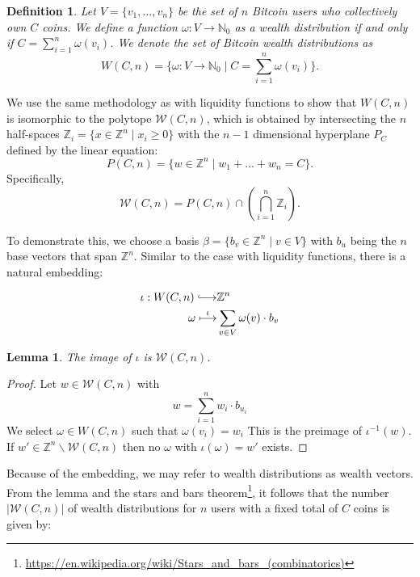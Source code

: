 \documentclass[10pt,twocolumn]{article}
\newtheorem{definition}{Definition}[section]
\newtheorem{lemma}[theorem]{Lemma}
\newcommand{\longhookrightarrow}{\lhook\joinrel\longrightarrow}
\begin{document}
\begin{definition}
Let \( V = \{v_1, \dots, v_n\} \) be the set of \( n \) Bitcoin users who collectively own \( C \) coins. We define a function \( \omega: V \longrightarrow \mathbb{N}_0 \) as a wealth distribution if and only if \( C = \sum_{i=1}^n \omega(v_i) \). We denote the set of Bitcoin wealth distributions as
$$
W(C,n) = \{\omega: V \longrightarrow \mathbb{N}_0 \mid C = \sum_{i=1}^n \omega(v_i)\}.
$$
\end{definition}

We use the same methodology as with liquidity functions to show that \( W(C,n) \) is isomorphic to the polytope \( \mathcal{W}(C,n) \), which is obtained by intersecting the \( n \) half-spaces \( \mathbb{Z}_i = \{x \in \mathbb{Z}^n \mid x_i \geq 0\} \) with the \( n-1 \) dimensional hyperplane \( P_C \) defined by the linear equation:
$$
P(C,n) = \{w \in \mathbb{Z}^n \mid w_1 + \dots + w_n = C\}.
$$
Specifically,
$$
\mathcal{W}(C,n) = P(C,n) \cap \left( \bigcap_{i=1}^n \mathbb{Z}_i \right).
$$

To demonstrate this, we choose a basis \( \beta = \{b_{v} \in \mathbb{Z}^{n} \mid v \in V\} \) with \( b_{u} \) being the \( n \) base vectors that span \( \mathbb{Z}^{n} \). Similar to the case with liquidity functions, there is a natural embedding:

\begin{equation*}
  \begin{split}
\iota: W(C,n) \longhookrightarrow & \mathbb{Z}^{n} \\
\omega\stackrel{\iota}{\longmapsto} & \sum_{v\in V}\omega(v)\cdot b_{v}
\end{split}
\end{equation*}

\begin{lemma}
  The image of $\iota$ is $\mathcal{W}(C,n)$.
\end{lemma}
\begin{proof}
  Let $w\in \mathcal{W}(C,n)$ with
  $$w = \sum_{i=1}^nw_i\cdot b_{u_i}$$
  We select $\omega\in W(C,n)$ such that $\omega(v_i)=w_i$
  This is the preimage of $\iota^{-1}(w)$.
  If $w'\in \mathbb{Z}^n\backslash\mathcal{W}(C,n)$ then no $\omega$ with $\iota(\omega)=w'$ exists.
\end{proof}

Because of the embedding, we may refer to wealth distributions as wealth vectors. From the lemma and the stars and bars theorem\footnote{\url{https://en.wikipedia.org/wiki/Stars_and_bars_(combinatorics)}}, it follows that the number \( |\mathcal{W}(C,n)| \) of wealth distributions for \( n \) users with a fixed total of \( C \) coins is given by:
\end{document}
